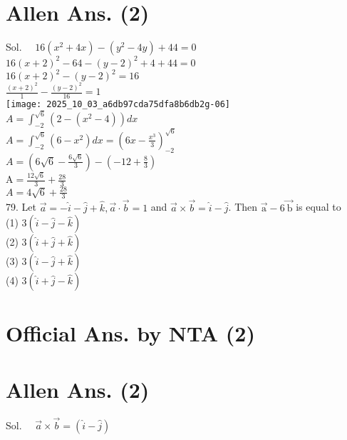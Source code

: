 \documentclass[10pt]{article}
\begin{document}
\section*{Allen Ans. (2)}
Sol. \(\quad 16\left(x^{2}+4 x\right)-\left(y^{2}-4 y\right)+44=0\)\\
\(16(x+2)^{2}-64-(y-2)^{2}+4+44=0\)\\
\(16(x+2)^{2}-(y-2)^{2}=16\)\\
\(\frac{(x+2)^{2}}{1}-\frac{(y-2)^{2}}{16}=1\)\\
\texttt{[image: 2025\_10\_03\_a6db97cda75dfa8b6db2g-06]}\\
\(A=\int_{-2}^{\sqrt{6}}\left(2-\left(x^{2}-4\right)\right) d x\)\\
\(A=\int_{-2}^{\sqrt{6}}\left(6-x^{2}\right) d x=\left(6 x-\frac{x^{3}}{3}\right)_{-2}^{\sqrt{6}}\)\\
\(A=\left(6 \sqrt{6}-\frac{6 \sqrt{6}}{3}\right)-\left(-12+\frac{8}{3}\right)\)\\
\(\mathrm{A}=\frac{12 \sqrt{6}}{3}+\frac{28}{3}\)\\
\(A=4 \sqrt{6}+\frac{28}{3}\)\\
79. Let \(\vec{a}=-\hat{i}-\hat{j}+\hat{k}, \vec{a} \cdot \vec{b}=1\) and \(\vec{a} \times \vec{b}=\hat{i}-\hat{j}\). Then \(\overrightarrow{\mathrm{a}}-6 \overrightarrow{\mathrm{~b}}\) is equal to\\
(1) \(3(\hat{i}-\hat{j}-\hat{k})\)\\
(2) \(3(\hat{i}+\hat{j}+\hat{k})\)\\
(3) \(3(\hat{i}-\hat{j}+\hat{k})\)\\
(4) \(3(\hat{i}+\hat{j}-\hat{k})\)

\section*{Official Ans. by NTA (2)}
\section*{Allen Ans. (2)}
Sol. \(\quad \vec{a} \times \vec{b}=(\hat{i}-\hat{j})\)
\end{document}
